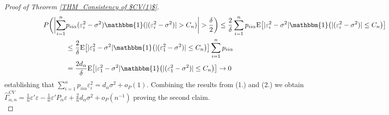 \documentclass[Research_Module_ES.tex]{subfiles}
\begin{document}
\begin{proof}[Proof of Theorem \ref{THM_Consistency of $CV(1)$}]
	\begin{align*}
	P\biggl(\biggl|\sum_{i=1}^n &p_{ii\alpha}(\varepsilon_i^2-\sigma^2)\mathbbm{1}(|(\varepsilon_i^2-\sigma^2)|> C_n)\biggr|>\frac{\delta}{2}\biggr) \le \frac{2}{\delta}\sum_{i=1}^n p_{ii\alpha}\mathrm{E}\bigl[|\varepsilon_i^2-\sigma^2|\mathbbm{1}\bigl(|(\varepsilon_i^2-\sigma^2)|\le C_n\bigr)\bigr]\\
	&\le  \frac{2}{\delta}\mathrm{E}\bigl[|\varepsilon_1^2-\sigma^2|\mathbbm{1}\bigl(|(\varepsilon_1^2-\sigma^2)|\le C_n\bigr)\bigr]\sum_{i=1}^n p_{ii\alpha} \\
	&=  \frac{2d_\alpha}{\delta}\mathrm{E}\bigl[|\varepsilon_1^2-\sigma^2|\mathbbm{1}\bigl(|(\varepsilon_1^2-\sigma^2)|\le C_n\bigr)\bigr] \to 0
	\end{align*}
	establishing that $\sum_{i=1}^n p_{ii\alpha}\varepsilon_i^2= d_\alpha \sigma^2 + o_P(1)$.
	Combining the results from (1.) and (2.) we obtain $\hat{\Gamma}_{\alpha,n}^{CV} =\frac{1}{n}\varepsilon'\varepsilon- \frac{1}{n}\varepsilon'P_\alpha\varepsilon + \frac{2}{n}d_\alpha\sigma^2 +o_P(n^{-1})$
	proving the second claim.\\
\end{proof}
\end{document}
